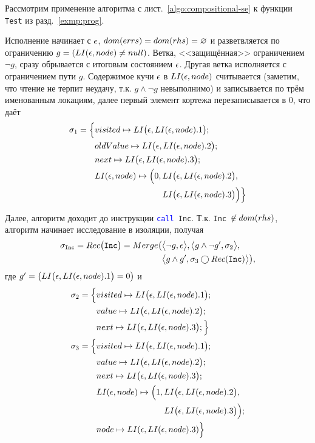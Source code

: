 \begin{exmp}\label{EXMP:HEAP-OF-PROG}
Рассмотрим применение алгоритма с лист.~\ref{algo:compositional-se} к функции \texttt{Test} из разд.~\ref{exmp:prog}.

Исполнение начинает с $\epsilon$, $dom(errs)=dom(rhs)=\varnothing$ и разветвляется по ограничению $g = (LI(\epsilon, node) \neq null)$. Ветка, <<защищённая>> ограничением $\neg g$, сразу обрывается с итоговым состоянием $\epsilon$. Другая ветка исполняется с ограничением пути $g$. Содержимое кучи $\epsilon$ в $LI(\epsilon, node)$ считывается (заметим, что чтение не терпит неудачу, т.к. $g\wedge \neg g$ невыполнимо) и записывается по трём именованным локациям, далее первый элемент кортежа перезаписывается в $0$, что даёт
\begin{align*}
\sigma_1 = \Big\{ &visited \mapsto LI\big(\epsilon, LI(\epsilon, node).1\big);\\&oldValue \mapsto LI\big(\epsilon, LI(\epsilon, node).2\big);\\
            & next \mapsto LI\big(\epsilon, LI(\epsilon, node).3\big);\\
			& LI(\epsilon, node)\mapsto \Big(0, LI\big(\epsilon, LI(\epsilon, node).2\big),\\ &\qquad\qquad\qquad\qquad LI\big(\epsilon, LI(\epsilon, node).3\big)\Big)\Big\}
\end{align*}

Далее, алгоритм доходит до инструкции \texttt{\textcolor{blue}{call} Inc}. Т.к. \texttt{Inc}~$\not\in dom(rhs)$, алгоритм начинает исследование  в изоляции, получая
\begin{align*}
\sigma_{\texttt{Inc}} = Rec\big(\texttt{Inc}\big) = Merge\big(&\big\langle\neg g, \epsilon\big\rangle, \big\langle g \wedge \neg g', \sigma_2\big\rangle,\\
&\big\langle g\wedge g', \sigma_3\bigcirc Rec(\texttt{Inc})\big\rangle\big),
\end{align*}
где $g' = \big(LI\big(\epsilon, LI(\epsilon, node).1\big) = 0\big)$ и
\begin{align*}
\sigma_2 = \Big\{ &visited \mapsto LI\big(\epsilon, LI(\epsilon, node).1\big);\\
&value \mapsto LI\big(\epsilon, LI(\epsilon, node).2\big);\\
&next \mapsto LI\big(\epsilon, LI(\epsilon, node).3\big);\Big\}\\
\sigma_3 = \Big\{ &visited \mapsto LI\big(\epsilon, LI(\epsilon, node).1\big);\\
&value \mapsto LI\big(\epsilon, LI(\epsilon, node).2\big);\\
&next \mapsto LI\big(\epsilon, LI(\epsilon, node).3\big);\\
			& LI(\epsilon, node)\mapsto \Big(1, LI\big(\epsilon, LI(\epsilon, node).2\big),\\
			& \qquad\qquad\qquad\qquad LI\big(\epsilon, LI(\epsilon, node).3\big)\Big);\\
&node \mapsto LI(\epsilon, LI(\epsilon, node).3)\Big\}
\end{align*}


\end{exmp}
